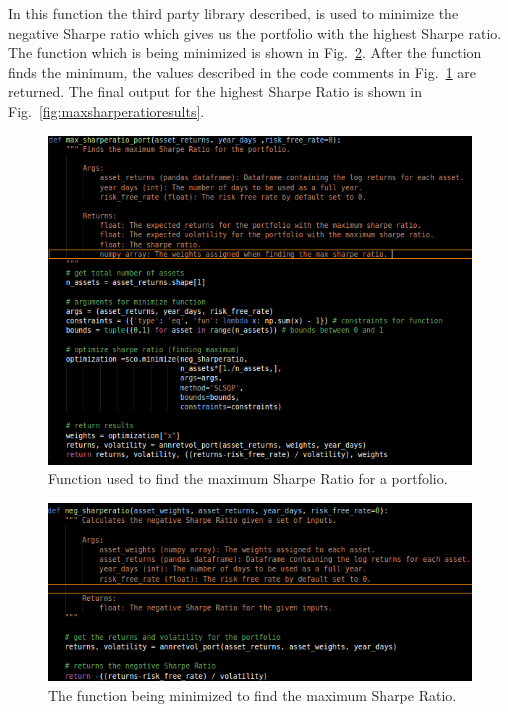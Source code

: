 \noindent
In this function the third party library described, is used to minimize the negative Sharpe ratio which gives us the portfolio with the highest Sharpe ratio. The function which is being minimized is shown in Fig.~\ref{fig:negsharperatio}. After the function finds the minimum, the values described in the code comments in Fig.~\ref{fig:maxsharperatio} are returned. The final output for the highest Sharpe Ratio is shown in Fig.~\ref{fig:maxsharperatioresults}. 

\begin{figure}[H]
\centering
  \includegraphics[scale = .65]{imgs/maxsharpefunc.png}
  \caption{Function used to find the maximum Sharpe Ratio for a portfolio.}
  \label{fig:maxsharperatio}
\end{figure}

\begin{figure}[H]
\centering
  \includegraphics[scale = .65]{imgs/negsharperatio.png}
  \caption{The function being minimized to find the maximum Sharpe Ratio.}
  \label{fig:negsharperatio}
\end{figure}

